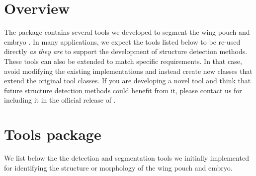 \section{Overview}
The package \toolsPkg contains several tools we developed to segment the \droso wing pouch and embryo \autocite{schaffter2013}. In many applications, we expect the tools listed below to be re-used directly \textit{as they are} to support the development of structure detection methods. These tools can also be extended to match specific requirements. In that case, avoid modifying the existing implementations and instead create new classes that extend the original tool classes. If you are developing a novel tool and think that future structure detection methods could benefit from it, please contact us for including it in the official release of \wingj.

\section{Tools package}

We list below the the detection and segmentation tools we initially implemented for identifying the structure or morphology of the \droso wing pouch and \droso embryo.

